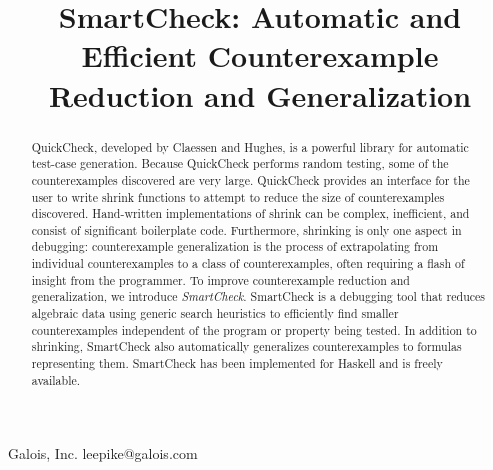 \documentclass{sigplanconf}
\begin{document}


\title{SmartCheck: Automatic and Efficient Counterexample Reduction and Generalization}

           {Galois, Inc.}
           {leepike@galois.com}
\maketitle

\begin{abstract}
QuickCheck, developed by Claessen and Hughes, is a powerful library for automatic test-case generation.  Because QuickCheck performs random testing, some of the counterexamples discovered are very large.  QuickCheck provides an interface for the user to write shrink functions to attempt to reduce the size of counterexamples discovered.  Hand-written implementations of shrink can be complex, inefficient, and consist of significant boilerplate code.  Furthermore, shrinking is only one aspect in debugging: counterexample generalization is the process of extrapolating from individual counterexamples to a class of counterexamples, often requiring a flash of insight from the programmer.  To improve counterexample reduction and generalization, we introduce \emph{SmartCheck}.  SmartCheck is a debugging tool that reduces algebraic data using generic search heuristics to efficiently find smaller counterexamples independent of the program or property being tested.  In addition to shrinking, SmartCheck also automatically generalizes counterexamples to formulas representing them.  SmartCheck has been implemented for Haskell and is freely available.
\end{abstract}



\end{document}
